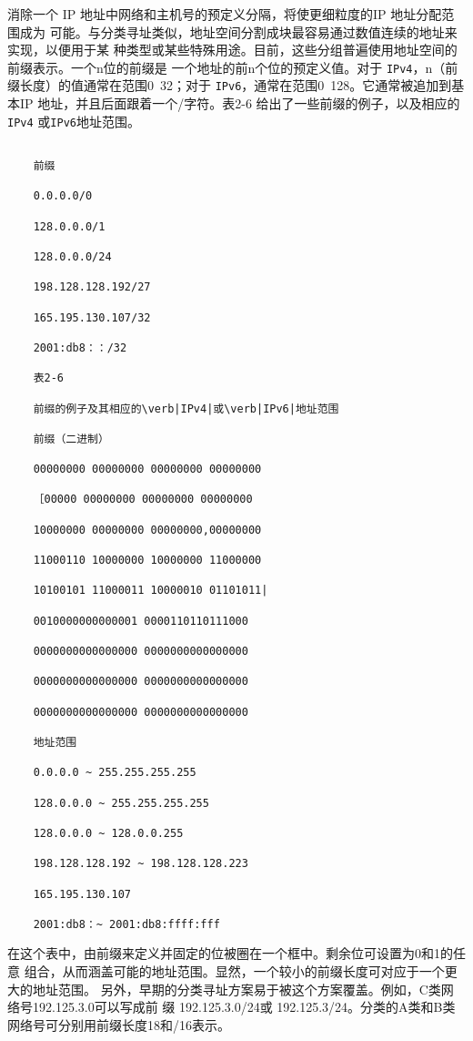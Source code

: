 消除一个 IP 地址中网络和主机号的预定义分隔，将使更细粒度的IP 地址分配范围成为
可能。与分类寻址类似，地址空间分割成块最容易通过数值连续的地址来实现，以便用于某
种类型或某些特殊用途。目前，这些分组普遍使用地址空间的前缀表示。一个n位的前缀是
一个地址的前n个位的预定义值。对于 \verb|IPv4|，n（前缀长度）的值通常在范围0~32；对于
\verb|IPv6|，通常在范围0~128。它通常被追加到基本IP 地址，并且后面跟着一个/字符。表2-6
给出了一些前缀的例子，以及相应的\verb|IPv4| 或\verb|IPv6|地址范围。
\begin{verbatim}
    
    前缀
    
    0.0.0.0/0
    
    128.0.0.0/1
    
    128.0.0.0/24
    
    198.128.128.192/27
    
    165.195.130.107/32
    
    2001:db8：：/32
    
    表2-6
    
    前缀的例子及其相应的\verb|IPv4|或\verb|IPv6|地址范围
    
    前缀（二进制）
    
    00000000 00000000 00000000 00000000
    
    ［00000 00000000 00000000 00000000
    
    10000000 00000000 00000000,00000000
    
    11000110 10000000 10000000 11000000
    
    10100101 11000011 10000010 01101011|
    
    0010000000000001 0000110110111000
    
    0000000000000000 0000000000000000
    
    0000000000000000 0000000000000000
    
    0000000000000000 0000000000000000
    
    地址范围
    
    0.0.0.0 ~ 255.255.255.255
    
    128.0.0.0 ~ 255.255.255.255
    
    128.0.0.0 ~ 128.0.0.255
    
    198.128.128.192 ~ 198.128.128.223
    
    165.195.130.107
    
    2001:db8：~ 2001:db8:ffff:fff
\end{verbatim}

在这个表中，由前缀来定义并固定的位被圈在一个框中。剩余位可设置为0和1的任意
组合，从而涵盖可能的地址范围。显然，一个较小的前缀长度可对应于一个更大的地址范围。
另外，早期的分类寻址方案易于被这个方案覆盖。例如，C类网络号192.125.3.0可以写成前
缀 192.125.3.0/24或 192.125.3/24。分类的A类和B类网络号可分别用前缀长度18和/16表示。


